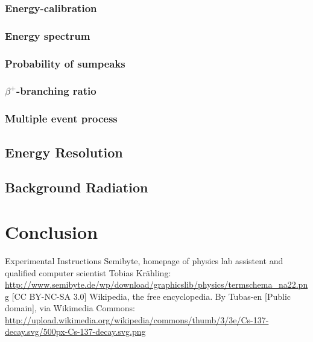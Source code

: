 \documentclass[bigchapter,colorback,accentcolor=tud4b,linedtoc,11pt]{tudreport}
\begin{document}
\subsection{Energy-calibration}
\subsection{Energy spectrum}
\subsection{Probability of sumpeaks}
\subsection{$\beta^+$-branching ratio}
\subsection{Multiple event process}

\section{Energy Resolution}

\section{Background Radiation}

\chapter{Conclusion}

\cleardoublepage{}
\newpage
\begin{thebibliography}{100}
   {Experimental Instructions}
   {Semibyte, homepage of physics lab assistent and qualified
      computer scientist Tobias Krähling:
      \url{http://www.semibyte.de/wp/download/graphicslib/physics/termschema_na22.png}
    [CC BY-NC-SA 3.0]}
   {Wikipedia, the free encyclopedia. By Tubas-en [Public
      domain], via Wikimedia Commons: \url{http://upload.wikimedia.org/wikipedia/commons/thumb/3/3e/Cs-137-decay.svg/500px-Cs-137-decay.svg.png}}
\end{thebibliography}
\end{document}
